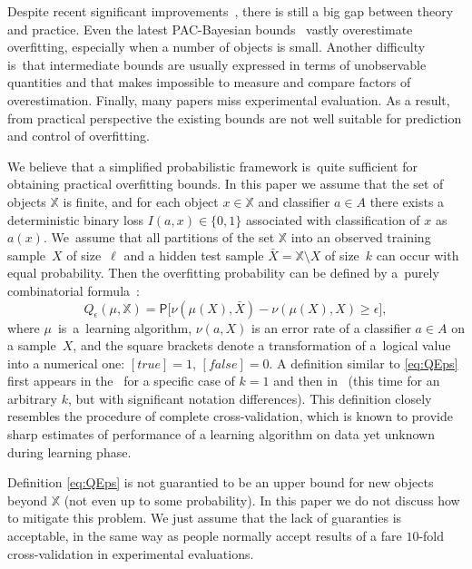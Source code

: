 \documentclass{article} %
\def\XX{\mathbb{X}}
\newcommand{\X}{\bar X}
\newcommand{\XXell}{[\XX]^\ell}
\def\CC_#1^#2{\tbinom{#1}{#2}}
\def\eps{\epsilon}
\providecommand{\Prob}{\mathsf{P}}
\begin{document}
Despite recent significant improvements~\cite{boucheron05survey}, there is still a big gap between theory and practice.
Even the latest PAC-Bayesian bounds~\cite{jin2012pacbayes} vastly overestimate overfitting, especially when a number of objects is small.
Another difficulty is~that intermediate bounds
are usually expressed in terms of unobservable quantities
and that makes impossible to measure and compare factors of overestimation.
Finally, many papers miss experimental evaluation.
As a result, from practical perspective the existing bounds are not well suitable
for prediction and control of overfitting.

We believe that a simplified probabilistic framework is~quite sufficient for obtaining practical overfitting bounds.
In this paper we assume that the set of objects $\XX$ is finite,
and for each object $x \in \XX$ and classifier $a \in A$ there exists a deterministic binary loss $I(a, x) \in \{0, 1\}$
associated with classification of $x$ as $a(x)$.
We~assume that all partitions of the set $\XX$ into
an observed training sample~$X$ of size~$\ell$
and a hidden test sample $\X=\XX\setminus X$ of size~$k$
can occur with equal probability.
Then the overfitting probability can be defined by a~purely combinatorial formula~\cite{voron09overfitting}:
\begin{equation}
    \label{eq:QEps}
    Q_\eps (\mu, \XX)
    =
    \Prob%
    \bigl[
        \nu(\mu(X), \X) - \nu(\mu(X),X)  \geq \eps
    \bigr],
\end{equation}
where
$\mu$~is~a~learning algorithm,
$\nu(a, X)$ is an error rate of a classifier $a \in A$ on a sample~$X$,
and the square brackets denote a transformation of a~logical value into a numerical one:
$[\textit{true}]=1$, $[\textit{false}]=0$. %
A definition similar to \eqref{eq:QEps} first appears in the~\cite{haussler94predicting} for a specific case of $k = 1$
and then in~\cite{bax97similar} (this time for an arbitrary $k$, but with significant notation differences).
This definition closely resembles the procedure of complete cross-validation,
which is known to provide sharp estimates of performance of a learning algorithm
on data yet unknown during learning phase.

Definition \eqref{eq:QEps} is not guarantied to be an upper bound for new objects beyond $\XX$
(not even up to some probability).  %
In this paper we do not discuss how to mitigate this problem.
We just assume that the lack of guaranties is acceptable,
in the same way as people normally accept results of a fare $10$-fold cross-validation in experimental evaluations.
\end{document}
